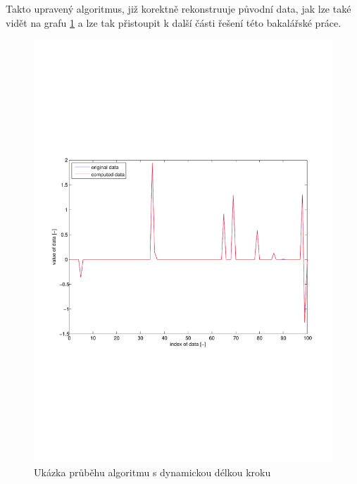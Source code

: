 \documentclass[FM,BP]{tulthesis}
\begin{document}
Takto upravený algoritmus, již korektně rekonstruuje původní data, jak lze také vidět na grafu \ref{fig:dynamicAlpha} a lze tak přistoupit k další části řešení této bakalářské práce.
\begin{figure}[!ht]
\begin{center}
\includegraphics[scale=0.5]{obr/dynamic.pdf}
\end{center}
\caption{Ukázka průběhu algoritmu s dynamickou délkou kroku}
\label{fig:dynamicAlpha}
\end{figure}
\end{document}
